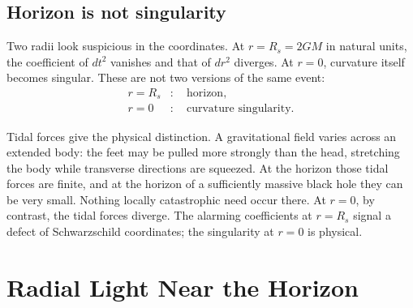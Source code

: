 
\subsection{Horizon is not singularity}

Two radii look suspicious in the coordinates.  At \(r=R_s=2GM\) in natural units, the coefficient of \(dt^2\) vanishes and that of \(dr^2\) diverges.  At \(r=0\), curvature itself becomes singular.  These are not two versions of the same event:
\begin{equation}
\begin{aligned}
r=R_s &:\quad \text{horizon},\\
r=0 &:\quad \text{curvature singularity}.
\end{aligned}
\end{equation}

Tidal forces give the physical distinction.  A gravitational field varies across an extended body: the feet may be pulled more strongly than the head, stretching the body while transverse directions are squeezed.  At the horizon those tidal forces are finite, and at the horizon of a sufficiently massive black hole they can be very small.  Nothing locally catastrophic need occur there.  At \(r=0\), by contrast, the tidal forces diverge.  The alarming coefficients at \(r=R_s\) signal a defect of Schwarzschild coordinates; the singularity at \(r=0\) is physical.


\section{Radial Light Near the Horizon}

